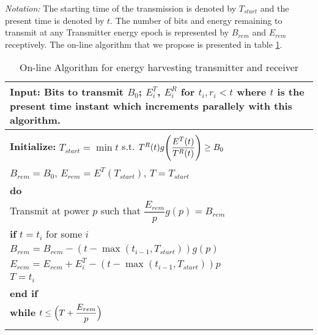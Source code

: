 \textit{Notation:} The starting time of the transmission is denoted by $T_{start}$ and the present time is denoted by $t$. The number of bits and energy remaining to transmit at any Transmitter energy epoch is represented by $B_{rem}$ and $E_{rem}$ receptively.
The on-line algorithm that we propose is presented in table \ref{online}.
\begin{table}
\begin{minipage}[b]{8cm}
\caption {On-line Algorithm for energy harvesting transmitter and receiver}
\begin{tabular}{p{7cm}}
\hline \textbf{Input}: Bits to transmit $B_0$; $E^T_i$, $E^R_i$ for $t_i,r_i<t$ where $t$ is the present time instant which increments parallely with this algorithm. 
\\
\hline
\\
\textbf{Initialize:} $T_{start}=\min t$ s.t. $T^R(t)g\Bigg{(} \dfrac{E^T(t)}{T^R(t)}\Bigg{)}\ge B_0$
\\
\hspace{12mm}$B_{rem}=B_0$, $E_{rem}=E^T(T_{start})$, $T=T_{start}$
\\
\textbf{do}
\\
\hspace{4mm} Transmit at power $p$ such that $\dfrac{E_{rem}}{p} g(p)= B_{rem}$
\\
\hspace{4mm} \textbf{if} $t=t_i$ for some $i$ 
\\
\hspace{7mm} $B_{rem}=B_{rem}-(t-\max (t_{i-1},T_{start}))g(p)$
\\
\hspace{7mm} $E_{rem}=E_{rem}+E^T_i-(t-\max (t_{i-1},T_{start}))p$
\\
\hspace{7mm} $T=t_i$
\\
\hspace{4mm} \textbf{end if}
\\
\textbf{while} $t\le \Big{(}T+\dfrac{E_{rem}}{p}\Big{)}$
\\
\hline
\label{online}
\end{tabular}
\end{minipage}
\end{table}

